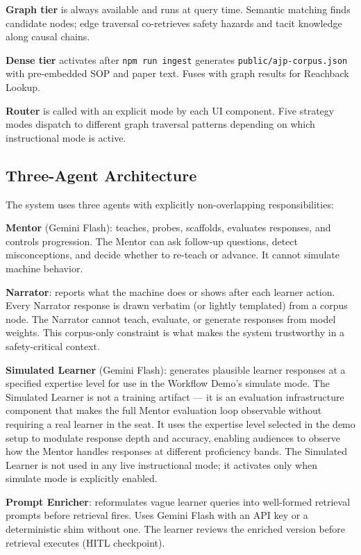 \documentclass[11pt,letterpaper]{article}
\newcommand{\code}[1]{\texttt{\small #1}}
\begin{document}
\textbf{Graph tier} is always available and runs at query time. Semantic matching finds candidate nodes; edge traversal co-retrieves safety hazards and tacit knowledge along causal chains.

\textbf{Dense tier} activates after \code{npm run ingest} generates \code{public/ajp-corpus.json} with pre-embedded SOP and paper text. Fuses with graph results for Reachback Lookup.

\textbf{Router} is called with an explicit mode by each UI component. Five strategy modes dispatch to different graph traversal patterns depending on which instructional mode is active.

\subsection{Three-Agent Architecture}
\label{sec:three-agent}

The system uses three agents with explicitly non-overlapping responsibilities:

\textbf{Mentor} (Gemini Flash): teaches, probes, scaffolds, evaluates responses, and controls progression. The Mentor can ask follow-up questions, detect misconceptions, and decide whether to re-teach or advance. It cannot simulate machine behavior.

\textbf{Narrator}: reports what the machine does or shows after each learner action. Every Narrator response is drawn verbatim (or lightly templated) from a corpus node. The Narrator cannot teach, evaluate, or generate responses from model weights. This corpus-only constraint is what makes the system trustworthy in a safety-critical context.

\textbf{Simulated Learner} (Gemini Flash): generates plausible learner responses at a specified expertise level for use in the Workflow Demo's simulate mode. The Simulated Learner is not a training artifact --- it is an evaluation infrastructure component that makes the full Mentor evaluation loop observable without requiring a real learner in the seat. It uses the expertise level selected in the demo setup to modulate response depth and accuracy, enabling audiences to observe how the Mentor handles responses at different proficiency bands. The Simulated Learner is not used in any live instructional mode; it activates only when simulate mode is explicitly enabled.

\textbf{Prompt Enricher}: reformulates vague learner queries into well-formed retrieval prompts before retrieval fires. Uses Gemini Flash with an API key or a deterministic shim without one. The learner reviews the enriched version before retrieval executes (HITL checkpoint).
\end{document}
